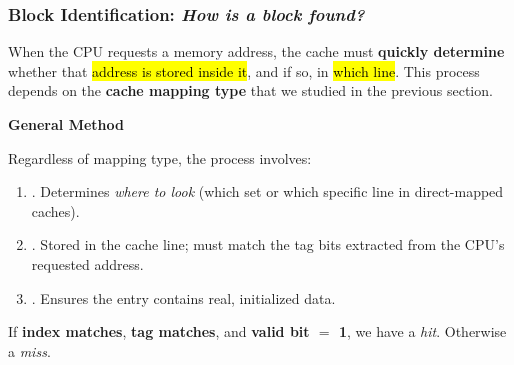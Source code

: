 \subsubsection{Block Identification: \emph{How is a block found?}}\label{subsubsection: block identification}

When the CPU requests a memory address, the cache must \textbf{quickly determine} whether that \hl{address is stored inside it}, and if so, in \hl{which line}. This process depends on the \textbf{cache mapping type} that we studied in the previous section.

\begin{flushleft}
    \textcolor{Green3}{ \textbf{General Method}}
\end{flushleft}
Regardless of mapping type, the process involves:
\begin{enumerate}
    \item {}. Determines \emph{where to look} (which set or which specific line in direct-mapped caches).
    \item {}. Stored in the cache line; must match the tag bits extracted from the CPU's requested address.
    \item {}. Ensures the entry contains real, initialized data.
\end{enumerate}
If \textbf{index matches}, \textbf{tag matches}, and \textbf{valid bit $=$ 1}, we have a \emph{hit}. Otherwise a \emph{miss}.

